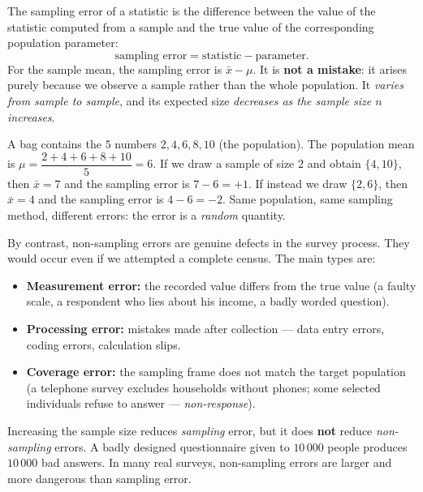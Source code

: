 \documentclass[11pt]{article}
\newcommand{\cle}[1]{{\popxbold\color{popdark}#1}}
\begin{document}
\begin{definition}
The \cle{sampling error} of a statistic is the difference between the value of the statistic computed from a sample and the true value of the corresponding population parameter:
\[
\text{sampling error} = \text{statistic} - \text{parameter}.
\]
For the sample mean, the sampling error is $\bar{x} - \mu$. It is \textbf{not a mistake}: it arises purely because we observe a sample rather than the whole population. It \emph{varies from sample to sample}, and its expected size \emph{decreases as the sample size $n$ increases}.
\end{definition}

\begin{exemplebox}
A bag contains the $5$ numbers $2, 4, 6, 8, 10$ (the population). The population mean is $\mu = \dfrac{2+4+6+8+10}{5} = 6$. If we draw a sample of size $2$ and obtain $\{4, 10\}$, then $\bar{x} = 7$ and the sampling error is $7 - 6 = +1$. If instead we draw $\{2, 6\}$, then $\bar{x} = 4$ and the sampling error is $4 - 6 = -2$. Same population, same sampling method, different errors: the error is a \emph{random} quantity.
\end{exemplebox}

By contrast, \cle{non-sampling errors} are genuine defects in the survey process. They would occur even if we attempted a complete census. The main types are:

\begin{itemize}
\item \textbf{Measurement error:} the recorded value differs from the true value (a faulty scale, a respondent who lies about his income, a badly worded question).
\item \textbf{Processing error:} mistakes made after collection — data entry errors, coding errors, calculation slips.
\item \textbf{Coverage error:} the sampling frame does not match the target population (a telephone survey excludes households without phones; some selected individuals refuse to answer — \emph{non-response}).
\end{itemize}

\begin{attention}
Increasing the sample size reduces \emph{sampling} error, but it does \textbf{not} reduce \emph{non-sampling} errors. A badly designed questionnaire given to $10\,000$ people produces $10\,000$ bad answers. In many real surveys, non-sampling errors are larger and more dangerous than sampling error.
\end{attention}
\end{document}
